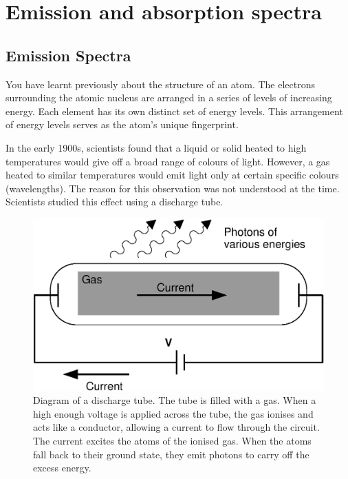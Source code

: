 \section{Emission and absorption spectra}

\subsection{Emission Spectra}

You have learnt previously about the structure of an atom.  The electrons surrounding the atomic nucleus are arranged in a series of levels of increasing energy.  Each element has its own distinct set of energy levels.  This arrangement of energy levels serves as the atom's unique fingerprint.
 
In the early 1900s, scientists found that a liquid or solid heated to high temperatures would give off a broad range of colours of light. However, a gas heated to similar temperatures would emit light only at certain specific colours (wavelengths).  The reason for this observation was not understood at the time.\\  
 
Scientists studied this effect using a discharge tube.  

\begin{figure}[H]
\begin{center}
\includegraphics[width=4.in]{../../epsimages/discharge_tube.eps}
\end{center}
\caption{Diagram of a discharge tube.  The tube is filled with a gas.  When a high enough voltage is applied across the tube, the gas ionises and acts like a conductor, allowing a current to flow through the circuit.  The current excites the atoms of the ionised gas.  When the atoms fall back to their ground state, they emit photons to carry off the excess energy.}
\label{dischargetube}
\end{figure}


